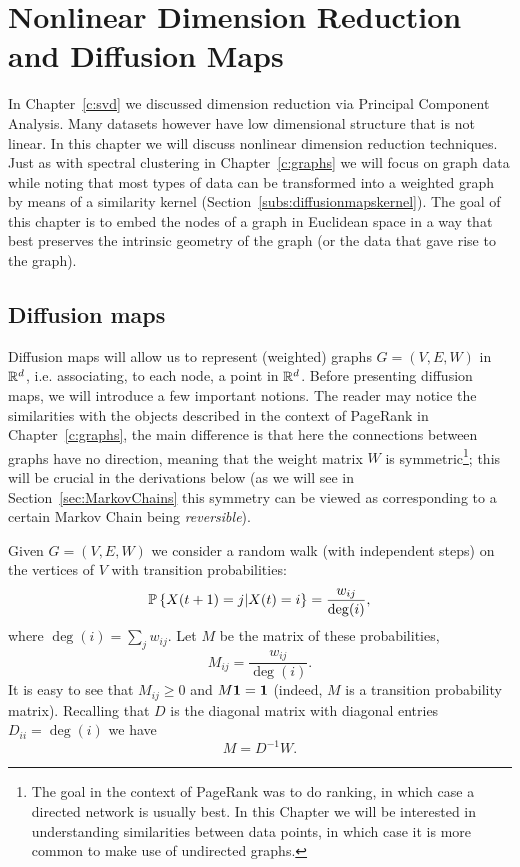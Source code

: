 \chapter{Nonlinear Dimension Reduction and Diffusion Maps}
\label{c:diffusion}



In Chapter~\ref{c:svd} we discussed dimension reduction via Principal Component Analysis. Many datasets however have low dimensional structure that is not linear. In this chapter we will discuss nonlinear dimension reduction techniques. Just as with spectral clustering in Chapter~\ref{c:graphs} we will focus on graph data while noting that most types of data can be transformed into a weighted graph by means of a similarity kernel (Section~\ref{subs:diffusionmapskernel}). The goal of this chapter is to embed the nodes of a graph in Euclidean space in a way that best preserves the intrinsic geometry of the graph (or the data that gave rise to the graph).

\section{Diffusion maps}

Diffusion maps \cite{RRCoifman_SLafon_2006} will allow us to represent (weighted) graphs $G=(V,E,W)$ in $\mathbb{R}^d$, i.e. associating, to each node, a point in $\mathbb{R}^d$. 
Before presenting diffusion maps, we will introduce a few important notions. The reader may notice the similarities with the objects described in the context of PageRank in Chapter~\ref{c:graphs}, the main difference is that here the connections between graphs have no direction, meaning that the weight matrix $W$ is symmetric\footnote{The goal in the context of PageRank was to do ranking, in which case a directed network is usually best. In this Chapter we will be interested in understanding similarities between data points, in which case it is more common to make use of undirected graphs.}; this will be crucial in the derivations below (as we will see in Section~\ref{sec:MarkovChains} this symmetry can be viewed as corresponding to a certain Markov Chain being \emph{reversible}).

Given $G=(V,E,W)$ we consider a random walk (with independent steps) on the vertices of $V$ with transition probabilities:
\[
 {\mathbb{P}}\left\{ X(t+1) = j | X(t) = i  \right\} = \frac{w_{ij}}{\deg(i)},
\]
where $\deg(i) = \sum_j w_{ij}$. Let $M$ be the matrix of these probabilities,
\begin{equation}\label{eq:def:M}
 M_{ij} = \frac{w_{ij}}{\deg(i)}.
\end{equation}
It is easy to see that $M_{ij}\geq 0$ and $M\mathbf{1} = \mathbf{1}$ (indeed, $M$ is a transition probability matrix). Recalling that $D$ is the diagonal matrix with diagonal entries $D_{ii} = \deg(i)$ we have
\[
 M = D^{-1}W.
\]

